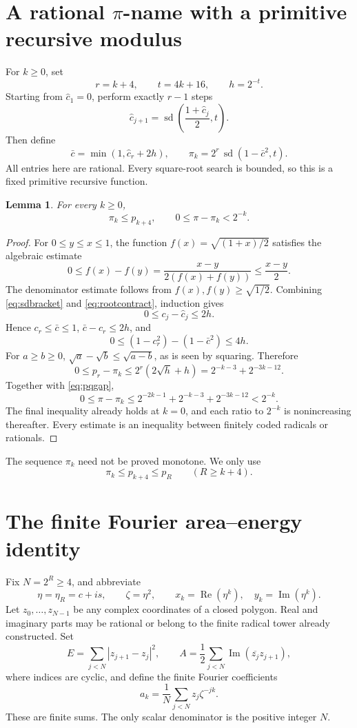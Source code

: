 \documentclass[11pt,a4paper]{article}
\newtheorem{lemma}[theorem]{Lemma}
\theoremstyle{definition}
\newcommand{\sd}{\operatorname{sd}}
\newcommand{\Rea}{\operatorname{Re}}
\newcommand{\Ima}{\operatorname{Im}}
\begin{document}
\section{A rational \texorpdfstring{\(\pi\)}{pi}-name with a primitive recursive modulus}
\label{sec:pi}
For \(k\ge0\), set
\[
 r=k+4,\qquad t=4k+16,\qquad h=2^{-t}.
\]
Starting from \(\widehat c_1=0\), perform exactly \(r-1\) steps
\[
 \widehat c_{j+1}
  =\sd\left(\frac{1+\widehat c_j}{2},t\right).
 \tag{4.1}\label{eq:chat}
\]
Then define
\[
 \bar c=\min(1,\widehat c_r+2h),\qquad
 \boxed{\pi_k=2^r\,\sd(1-\bar c^2,t).}
 \tag{4.2}\label{eq:pilower}
\]
All entries here are rational. Every square-root search is bounded,
so this is a fixed primitive recursive function.

\begin{lemma}\label{lem:pilower}
For every \(k\ge0\),
\[
 \pi_k\le p_{k+4},\qquad
 0\le\pi-\pi_k<2^{-k}.
 \tag{4.3}\label{eq:pilowerbounds}
\]
\end{lemma}
\begin{proof}
For \(0\le y\le x\le1\), the function
\(f(x)=\sqrt{(1+x)/2}\) satisfies the algebraic estimate
\[
 0\le f(x)-f(y)
 =\frac{x-y}{2(f(x)+f(y))}\le\frac{x-y}{2}.
 \tag{4.4}\label{eq:rootcontract}
\]
The denominator estimate follows from
\(f(x),f(y)\ge\sqrt{1/2}\).
Combining \eqref{eq:sdbracket} and \eqref{eq:rootcontract}, induction gives
\[
 0\le c_j-\widehat c_j\le2h.
\]
Hence \(c_r\le\bar c\le1\), \(\bar c-c_r\le2h\), and
\[
 0\le(1-c_r^2)-(1-\bar c^2)\le4h.
\]
For \(a\ge b\ge0\),
\(\sqrt a-\sqrt b\le\sqrt{a-b}\), as is seen by squaring.
Therefore
\[
 0\le p_r-\pi_k
 \le2^r(2\sqrt h+h)
 =2^{-k-3}+2^{-3k-12}.
 \tag{4.5}\label{eq:raderror}
\]
Together with \eqref{eq:pqgap},
\[
 0\le\pi-\pi_k
 \le 2^{-2k-1}+2^{-k-3}+2^{-3k-12}<2^{-k}.
 \tag{4.6}\label{eq:pierror}
\]
The final inequality already holds at \(k=0\), and each ratio to
\(2^{-k}\) is nonincreasing thereafter. Every estimate is an
inequality between finitely coded radicals or rationals.
\end{proof}

The sequence \(\pi_k\) need not be proved monotone. We only use
\[
 \pi_k\le p_{k+4}\le p_R\qquad(R\ge k+4).
 \tag{4.7}\label{eq:pimonouse}
\]

\section{The finite Fourier area--energy identity}\label{sec:fourier}
Fix \(N=2^R\ge4\), and abbreviate
\[
 \eta=\eta_R=c+is,\qquad \zeta=\eta^2,\qquad
 x_k=\Rea(\eta^k),\quad y_k=\Ima(\eta^k).
\]
Let \(z_0,\ldots,z_{N-1}\) be any complex coordinates of a closed
polygon. Real and imaginary parts may be rational or belong to the
finite radical tower already constructed. Set
\[
 E=\sum_{j<N}|z_{j+1}-z_j|^2,\qquad
 A=\frac12\sum_{j<N}\Ima(\overline{z_j}z_{j+1}),
 \tag{5.1}\label{eq:EA}
\]
where indices are cyclic, and define the finite Fourier coefficients
\[
 a_k=\frac1N\sum_{j<N}z_j\zeta^{-jk}.
 \tag{5.2}\label{eq:DFT}
\]
These are finite sums. The only scalar denominator is the positive
integer \(N\).
\end{document}
